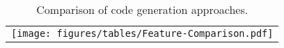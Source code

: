 
\begin{table}[t]
    \centering
    \begin{tabular}{c}
    \hspace*{-0.35cm}
    \texttt{[image: figures/tables/Feature-Comparison.pdf]}
    \end{tabular}
    \vspace{-3mm}
    \caption{Comparison of code generation approaches.}
    \label{tab:feature-compare-table}
    \vspace{-4mm}
\end{table}
